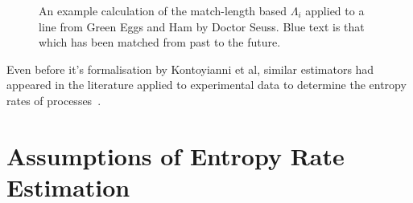 \begin{figure}[hb]
	\caption{An example calculation of the match-length based $\Lambda_i$ applied to a line from Green Eggs and Ham by Doctor Seuss. {\color{blue} Blue text} is that which has been matched from past to the future. }
\end{figure}


Even before it's formalisation by Kontoyianni et al, similar estimators had appeared in the literature applied to experimental data to determine the entropy rates of processes~\cite{chenUsingDifficultyPrediction1993, chenFastPatternMatching1995, farachEntropyDNAAlgorithms1995, juolaWhatCanWe1997}.



\section{Assumptions of Entropy Rate Estimation}






